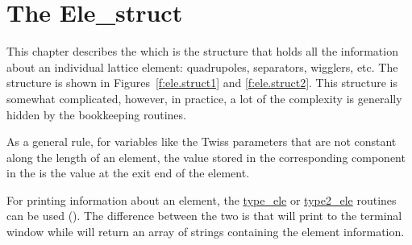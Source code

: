 \chapter{The Ele_struct}
\label{c:ele.struct}

This chapter describes the  which is the structure that
holds all the information about an individual lattice element:
quadrupoles, separators, wigglers, etc. The  structure is
shown in Figures~\ref{f:ele.struct1}  and \ref{f:ele.struct2}. This
structure is somewhat complicated, however, in practice, a lot of the
complexity is generally hidden  by the \bmad bookkeeping routines.

As a general rule, for variables like the Twiss parameters that are not
constant along the length of an element, the value stored in the
corresponding component in the  is the value at the exit
end of the element.

For printing information about an element, the
\hyperref[r:type.ele]{type_ele} or \hyperref[r:type2.ele]{type2_ele} routines
can be used (). The difference between the two is
that  will print to the terminal window while 
will return an array of strings containing the element information.

